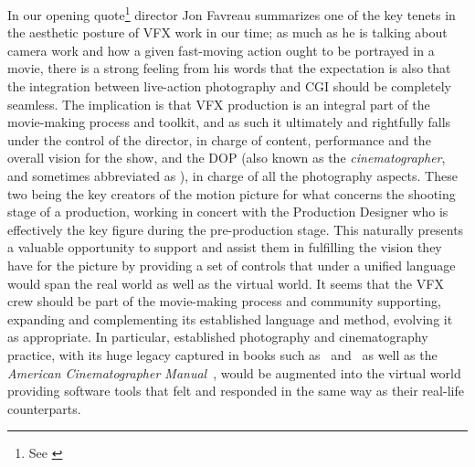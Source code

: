 In our opening quote\footnote{See \cite{duncan08}} director Jon Favreau summarizes one of the key 
tenets in the aesthetic posture of \gls{VFX} work in our time; as much as he is talking
about camera work and how a given fast-moving action ought to be portrayed in a movie, 
there is a strong feeling from his words that the expectation is also that the integration between 
live-action photography and \gls{CGI} should be completely seamless.
The implication is that \gls{VFX} production is an integral part of the movie-making process and toolkit, 
and as such it ultimately and rightfully falls under the control of the director, in charge of content, 
performance and the overall vision for the show, and the \gls{DOP} (also known as 
the \textsl{cinematographer}, and sometimes abbreviated as ), in charge of all the photography aspects. 
These two being the key creators of the motion picture for what concerns the shooting stage of a production,
working in concert with the Production Designer who is effectively the key figure during the
pre-production stage. 
This naturally presents a valuable opportunity to support and assist them in fulfilling the vision
they have for the picture by providing a set of controls that under a unified language would span the 
real world as well as the \gls{virtual} world.
It seems that the \gls{VFX} crew should be part of the movie-making process and community supporting,
expanding and complementing its established language and method, evolving it as appropriate.
In particular, established photography and cinematography practice, with its huge 
legacy captured in books such as~\cite{alton1995} and~\cite{lowell1992} as well as
the \emph{American Cinematographer Manual}~\cite{burum2007}, would be augmented into the \gls{virtual} world
providing software tools that felt and responded in the same way as their real-life counterparts.

